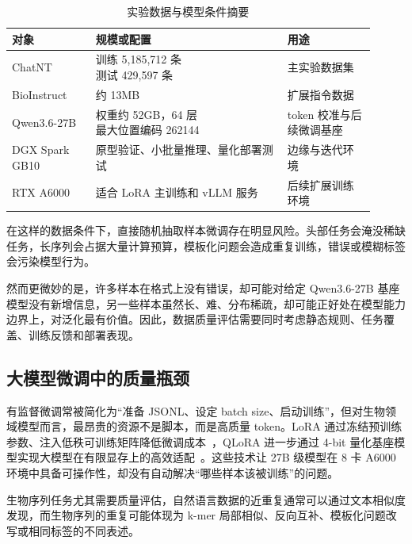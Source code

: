 \documentclass{article}
\begin{document}
\begin{table}[htbp]
    \centering
    \renewcommand{\arraystretch}{1.2}
    \setlength{\tabcolsep}{6pt}
    \caption{实验数据与模型条件摘要}
    \begin{tabular}{
        >{\centering\arraybackslash}p{0.21\linewidth}
        >{\centering\arraybackslash}p{0.48\linewidth}
        >{\centering\arraybackslash}p{0.22\linewidth}
    }
        \bottomrule[1.5pt]
        对象 & 规模或配置 & 用途 \\
        \midrule[0.75pt]
        ChatNT & \makecell{训练 5,185,712 条 \\ 测试 429,597 条} & 主实验数据集 \\
        \hline
        BioInstruct & 约 13MB & 扩展指令数据 \\
        \hline
        Qwen3.6-27B & \makecell{权重约 52GB，64 层 \\ 最大位置编码 262144} & token 校准与后续微调基座 \\
        \hline
        DGX Spark GB10 & 原型验证、小批量推理、量化部署测试 & 边缘与迭代环境 \\
        \hline
        RTX A6000 & 适合 LoRA 主训练和 vLLM 服务 & 后续扩展训练环境 \\
        \toprule[1.5pt]
    \end{tabular}
\end{table}

在这样的数据条件下，直接随机抽取样本微调存在明显风险。头部任务会淹没稀缺任务，长序列会占据大量计算预算，模板化问题会造成重复训练，错误或模糊标签会污染模型行为。

然而更微妙的是，许多样本在格式上没有错误，却可能对给定 Qwen3.6-27B 基座模型没有新增信息，另一些样本虽然长、难、分布稀疏，却可能正好处在模型能力边界上，对泛化最有价值。因此，数据质量评估需要同时考虑静态规则、任务覆盖、训练反馈和部署表现。



\subsection{大模型微调中的质量瓶颈}
有监督微调常被简化为“准备 JSONL、设定 batch size、启动训练”，但对生物领域模型而言，最昂贵的资源不是脚本，而是高质量 token。LoRA 通过冻结预训练参数、注入低秩可训练矩阵降低微调成本~\cite{lora}，QLoRA 进一步通过 4-bit 量化基座模型实现大模型在有限显存上的高效适配~\cite{qlora}。这些技术让 27B 级模型在 8 卡 A6000 环境中具备可操作性，却没有自动解决“哪些样本该被训练”的问题。

生物序列任务尤其需要质量评估，自然语言数据的近重复通常可以通过文本相似度发现，而生物序列的重复可能体现为 k-mer 局部相似、反向互补、模板化问题改写或相同标签的不同表述。
\end{document}

